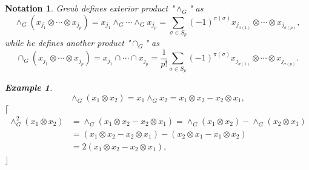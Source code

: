 \documentclass[aps,preprint]{revtex4}%
\newtheorem{example}[theorem]{Example}
\newtheorem{notation}[theorem]{Notation}
\begin{document}
\begin{notation}
Greub defines exterior product "$\wedge_{G}$" as
\begin{equation}
\wedge_{G}\left(  x_{j_{1}}\otimes\cdots\otimes x_{j_{p}}\right)  =x_{j_{1}%
}\wedge_{G}\cdots\wedge_{G}x_{j_{p}}=\sum_{\sigma\in S_{p}}\left(  -1\right)
^{\pi\left(  \sigma\right)  }x_{j_{\sigma\left(  1\right)  }}\otimes
\cdots\otimes x_{j_{\sigma\left(  p\right)  }},
\end{equation}
while he defines another product "$\cap_{G}$" as
\begin{equation}
\cap_{G}\left(  x_{j_{1}}\otimes\cdots\otimes x_{j_{p}}\right)  =x_{j_{1}}%
\cap\cdots\cap x_{j_{p}}=\frac{1}{p!}\sum_{\sigma\in S_{p}}\left(  -1\right)
^{\pi\left(  \sigma\right)  }x_{j_{\sigma\left(  1\right)  }}\otimes
\cdots\otimes x_{j_{\sigma\left(  p\right)  }}.
\end{equation}


\begin{example}%
\begin{equation}
\wedge_{G}\left(  x_{1}\otimes x_{2}\right)  =x_{1}\wedge_{G}x_{2}%
=x_{1}\otimes x_{2}-x_{2}\otimes x_{1},
\end{equation}
$\lceil$%
\begin{align}
\wedge_{G}^{2}\left(  x_{1}\otimes x_{2}\right)   &  =\wedge_{G}\left(
x_{1}\otimes x_{2}-x_{2}\otimes x_{1}\right)  =\wedge_{G}\left(  x_{1}\otimes
x_{2}\right)  -\wedge_{G}\left(  x_{2}\otimes x_{1}\right) \\
&  =\left(  x_{1}\otimes x_{2}-x_{2}\otimes x_{1}\right)  -\left(
x_{2}\otimes x_{1}-x_{1}\otimes x_{2}\right) \\
&  =2\left(  x_{1}\otimes x_{2}-x_{2}\otimes x_{1}\right)  ,
\end{align}
$\rfloor$


\end{example}
\end{notation}
\end{document}
